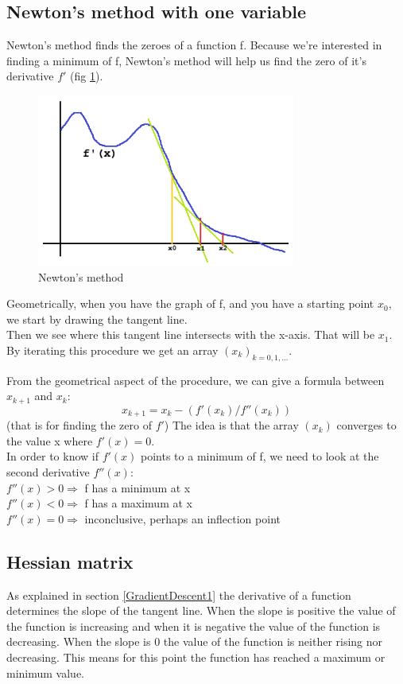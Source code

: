 \documentclass[journal]{IEEEtran}
\begin{document}
\subsection{Newton's method with one variable}
\label{Newton1}
Newton's method finds the zeroes of a function f. Because we're interested in finding a minimum of f,
Newton's method will help us find the zero of it's derivative $f'$ (fig \ref{NewtonMethodFig}).\\
\begin{figure}[H]
    \includegraphics[width=8.5cm,keepaspectratio]{images/fx_example_02.png}
    \caption{Newton's method}
    \label{NewtonMethodFig}
\end{figure}
Geometrically, when you have the graph of f, and you have a starting point $x_0$, we start by drawing the tangent line.\\
Then we see where this tangent line intersects with the x-axis. That will be $x_1$.\\
By iterating this procedure we get an array $(x_k)_{k=0,1,\ldots}$.

From the geometrical aspect of the procedure, we can give a formula between $x_{k+1}$ and $x_k$:
\[
x_{k+1} = x_k - (f'(x_k) / f''(x_k))
\]
(that is for finding the zero of $f'$)
The idea is that the array $(x_k)$ converges to the value x where $f'(x) = 0$.\\

In order to know if $f'(x)$ points to a minimum of f, we need to look at the second derivative $f''(x)$:\\
$f''(x) > 0 \Rightarrow$ f has a minimum at x\\
$f''(x) < 0 \Rightarrow$ f has a maximum at x\\
$f''(x) = 0 \Rightarrow$ inconclusive, perhaps an inflection point\\

\subsection{Hessian matrix}
\label{HessianMatricesSub}
As explained in section \ref{GradientDescent1} the derivative of a function determines the slope of the tangent line. When the slope is positive the value of the function is increasing and when it is negative the value of the function is decreasing. When the slope is 0 the value of the function is neither rising nor decreasing. This means for this point the function has reached a maximum or minimum value.
\end{document}

